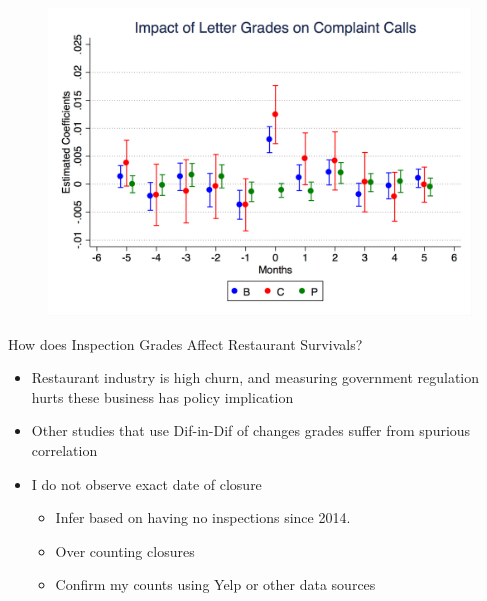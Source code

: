 \documentclass[handout]{beamer}
\begin{document}
\begin{frame}
\begin{figure}
\centering
\includegraphics[scale = .35]{../../Figures/Calls/lead_lag_calls_letter}
\end{figure}
\end{frame}


\begin{frame}{How does Inspection Grades Affect Restaurant Survivals?}
\begin{itemize}
\item Restaurant industry is high churn, and measuring government regulation hurts these business has policy implication
\item Other studies that use Dif-in-Dif of changes grades suffer from spurious correlation
\item I do not observe exact date of closure
\begin{itemize}
\item Infer based on having no inspections since 2014. 
\item Over counting closures
\item Confirm my counts using Yelp or other data sources
\end{itemize}
\end{itemize}
\end{frame}
\end{document}
